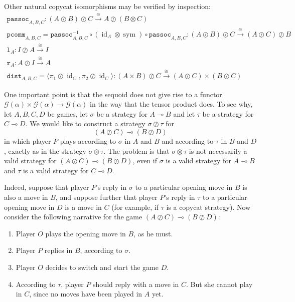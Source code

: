 \documentclass[11pt]{article} %
\theoremstyle{plain} %
\theoremstyle{definition} %
\theoremstyle{note}
\theoremstyle{exercisestyle}
\newcommand*\from{\colon}
\def \inv {^{-1}}
\DeclareMathOperator{\id}{id}
\newcommand{\tensor}{\otimes}
\newcommand{\sequoid}{\oslash}
\renewcommand{\implies}{\multimap}
\newcommand{\comp}[2]{#1 \circ #2}
\newcommand{\G}{\mathcal G}
\DeclareMathOperator{\sym}{sym}
\newcommand{\braid}{\sym}
\newcommand{\toisom}{{\xrightarrow{\cong}}}
\newcommand{\passoc}{{\texttt{passoc}}}
\newcommand{\pcomm}{{\texttt{pcomm}}}
\newcommand{\run}{{\texttt{r}}}
\newcommand{\lun}{{\texttt{l}}}
\newcommand{\dist}{{\texttt{dist}}}
\begin{document}
Other natural copycat isomorphisms may be verified by inspection:
\begin{gather*}
  \passoc_{A,B,C} \from (A\sequoid B) \sequoid C \toisom A\sequoid (B\tensor C) \\
  \pcomm_{A,B,C} = \comp{\passoc_{A,B,C}\inv}{\comp{(\id_A\tensor\braid)}{\passoc_{A,B,C}}} \from (A\sequoid B)\sequoid C \toisom (A\sequoid C)\sequoid B\\
  \lun_A \from I\sequoid A \toisom I\\
  \run_A \from A\sequoid I \toisom A \\
  \dist_{A,B,C}=\langle \pi_1\sequoid\id_C,\pi_2\sequoid\id_C\rangle\from (A\times B)\sequoid C \toisom (A\sequoid C)\times(B\sequoid C)
\end{gather*}

One important point is that the sequoid does not give rise to a functor $\G(\alpha)\times\G(\alpha)\to\G(\alpha)$ in the way that the tensor product does.  To see why, let $A,B,C,D$ be games, let $\sigma$ be a strategy for $A\implies B$ and let $\tau$ be a strategy for $C\implies D$.  We would like to construct a strategy $\sigma\sequoid\tau$ for
\[
  (A\sequoid C)\implies (B\sequoid D)
  \]
in which player $P$ plays according to $\sigma$ in $A$ and $B$ and according to $\tau$ in $B$ and $D$, exactly as in the strategy $\sigma\tensor\tau$.  The problem is that $\sigma\tensor\tau$ is not necessarily a valid strategy for $(A\sequoid C)\implies (B\sequoid D)$, even if $\sigma$ is a valid strategy for $A\implies B$ and $\tau$ is a valid strategy for $C\implies D$.  

Indeed, suppose that player $P$'s reply in $\sigma$ to a particular opening move in $B$ is also a move in $B$, and suppose further that player $P$'s reply in $\tau$ to a particular opening move in $D$ is a move in $C$ (for example, if $\tau$ is a copycat strategy).  Now consider the following narrative for the game $(A\sequoid C)\implies (B\sequoid D)$:
\begin{enumerate}
  \item Player $O$ plays the opening move in $B$, as he must.
  \item Player $P$ replies in $B$, according to $\sigma$.  
  \item Player $O$ decides to switch and start the game $D$.
  \item According to $\tau$, player $P$ should reply with a move in $C$.  But she cannot play in $C$, since no moves have been played in $A$ yet.
\end{enumerate}
\end{document}
